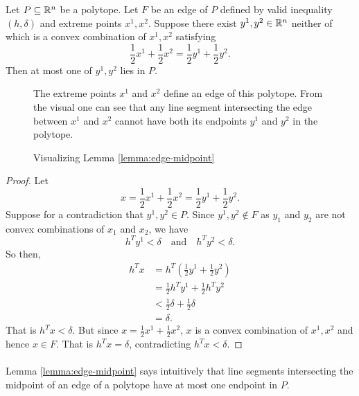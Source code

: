 \begin{lemma}\label{lemma:edge-midpoint}
Let $P \subseteq \mathbb{R}^n$ be a polytope. Let $F$ be an edge of $P$ defined by valid inequality $(h,\delta)$ and extreme points $x^1, x^2$. Suppose there exist $y^1, y^2 \in \mathbb{R}^n$ neither of which is a convex combination of $x^1, x^2$ satisfying
$$\frac{1}{2}x^1 + \frac{1}{2} x^2 = \frac{1}{2} y^1 + \frac{1}{2}y^2.$$
Then at most one of $y^1, y^2$ lies in $P$.
\end{lemma}
\begin{figure}
\centering
{}
\caption{Visualizing Lemma \ref{lemma:edge-midpoint}}
\small
\begin{flushleft}
The extreme points $x^1$ and $x^2$ define an edge of this polytope. From the visual one can see that any line segment intersecting the edge between $x^1$ and $x^2$ cannot have both its endpoints $y^1$ and $y^2$ in the polytope.
\end{flushleft}
\end{figure}
\begin{proof}
Let $$x = \frac{1}{2}x^1 + \frac{1}{2} x^2 = \frac{1}{2} y^1 + \frac{1}{2}y^2.$$ Suppose for a contradiction that $y^1,y^2 \in P$. Since $y^1, y^2 \not\in F$ as $y_1$ and $y_2$ are not convex combinations of $x_1$ and $x_2$, we have
$$h^Ty^1 < \delta \quad\text{and}\quad h^Ty^2 < \delta. $$
So then,
\begin{align*}
h^Tx &= h^T(\frac{1}{2}y^1 + \frac{1}{2}y^2) \\
&= \frac{1}{2}h^Ty^1 + \frac{1}{2}h^Ty^2 \\
&< \frac{1}{2}\delta + \frac{1}{2}\delta \\
&= \delta.
\end{align*}
That is $h^T x < \delta$. But since $x = \frac{1}{2} x^1 + \frac{1}{2}x^2$, $x$ is a convex combination of $x^1, x^2$ and hence $x \in F$. That is $h^T x = \delta$, contradicting $h^T x < \delta$.
\end{proof}
\paragraph{}
Lemma \ref{lemma:edge-midpoint} says intuitively that line segments intersecting the midpoint of an edge of a polytope have at most one endpoint in $P$.
